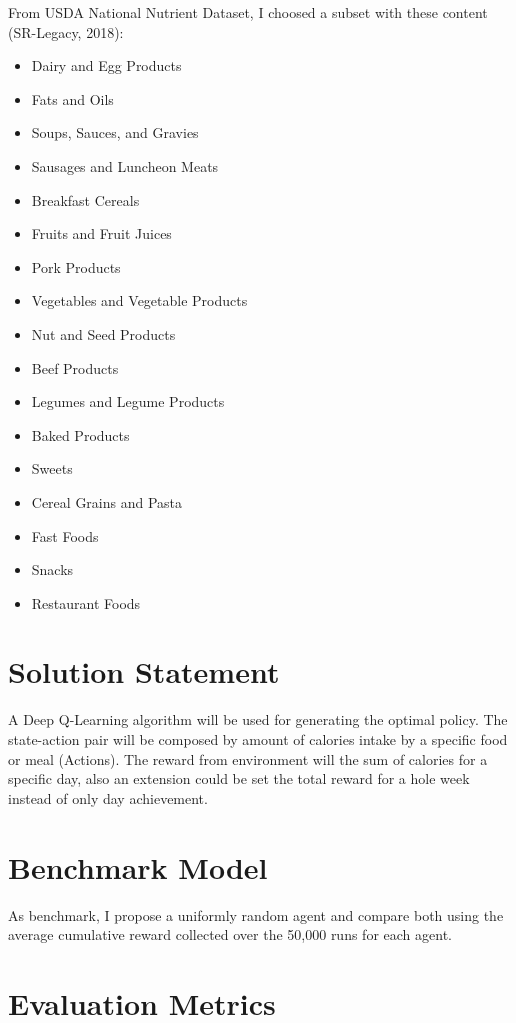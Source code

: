 \documentclass{article}
\begin{document}
From USDA National Nutrient Dataset, I choosed a subset with these content (SR-Legacy, 2018):

\begin{itemize}
    \item Dairy and Egg Products
    \item Fats and Oils
    \item Soups, Sauces, and Gravies
    \item Sausages and Luncheon Meats
    \item Breakfast Cereals
    \item Fruits and Fruit Juices
    \item Pork Products
    \item Vegetables and Vegetable Products
    \item Nut and Seed Products
    \item Beef Products
    \item Legumes and Legume Products
    \item Baked Products
    \item Sweets
    \item Cereal Grains and Pasta
    \item Fast Foods
    \item Snacks
    \item Restaurant Foods
\end{itemize}

\section{Solution Statement}

A Deep Q-Learning algorithm will be used for generating the optimal policy. The state-action pair 
will be composed by amount of calories intake by a specific food or meal (Actions). The reward from 
environment will the sum of calories for a specific day, also an extension could be set the total 
reward for a hole week instead of only day achievement.

\section{Benchmark Model}

As benchmark, I propose a uniformly random agent and compare both using the average cumulative 
reward collected over the 50,000 runs for each agent.

\section{Evaluation Metrics}
\end{document}
